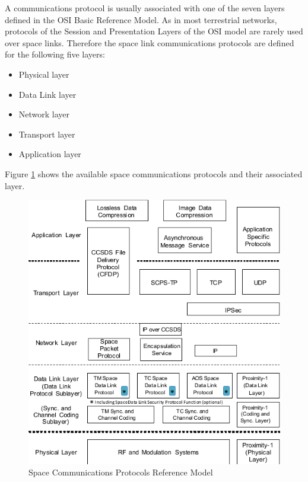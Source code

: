 A communications protocol is usually associated with one of the seven layers defined in the OSI Basic Reference Model. As in most terrestrial networks, protocols of the Session and Presentation Layers of the OSI model are rarely used over space links. Therefore the space link communications protocols are defined for the following five layers:

\begin{itemize}
\item Physical layer
\item Data Link layer
\item Network layer
\item Transport layer
\item Application layer
\end{itemize}

Figure \ref{fig:Space Communications Protocols Reference Model} shows the available space communications protocols and their associated layer.

\begin{figure}[h]
\centering\includegraphics[scale=0.7]{fig/space_communications_protocols_reference_model}
\caption{Space Communications Protocols Reference Model}
\label{fig:Space Communications Protocols Reference Model}
\end{figure}

